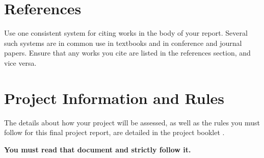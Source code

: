 \documentclass[]{final_report}
\theoremstyle{definition}
\begin{document}
\chapter{References}

Use one consistent system for citing works in the body of your report. Several such systems are in common use in textbooks and in conference and journal papers. Ensure that any works you cite are listed in the references section, and vice versa. 

\chapter{Project Information and Rules}

The details about how your project will be assessed, as well as the rules you must follow for this final project report, are detailed in the project booklet
.

\textbf{You must read that document and strictly follow it.}


\newpage

\printbibliography
\label{endpage}
\end{document}
